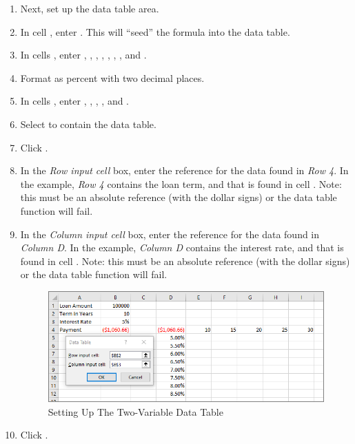 \begin{enumbox}
\begin{enumerate}
		\item Next, set up the data table area.
		\item In cell , enter . This will ``seed'' the  formula into the data table.
		\item In cells , enter , , , , , , , and .
		\item Format  as percent with two decimal places.
		\item In cells , enter , , , , and .
		\item Select  to contain the data table.
		\item Click .
		\item In the \textit{Row input cell} box, enter the reference for the data found in \textit{Row 4}. In the example, \textit{Row 4} contains the loan term, and that is found in cell . Note: this must be an absolute reference (with the dollar signs) or the data table function will fail.
		\item In the \textit{Column input cell} box, enter the reference for the data found in \textit{Column D}. In the example, \textit{Column D} contains the interest rate, and that is found in cell . Note: this must be an absolute reference (with the dollar signs) or the data table function will fail.
	
		\begin{figure}[H]
			\centering
			\includegraphics[width=\maxwidth{.95\linewidth}]{gfx/ch08_fig44}
			\caption{Setting Up The Two-Variable Data Table}
			\label{08:fig44}
		\end{figure}
	
		\item Click .
	\end{enumerate}
\end{enumbox}
	
